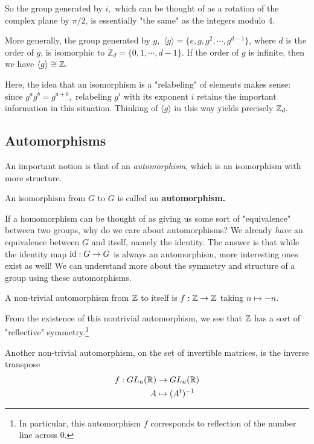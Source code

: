 So the group generated by $i,$ which can be thought of as a rotation of the complex plane by $\pi/2$, is essentially "the same" as the integers modulo 4. 

\begin{example}
More generally, the group generated by $g, $ $\langle g \rangle = \{e, g,  g^2, \cdots, g^{d-1}\}$, where $d$ is the order of $g$, is isomorphic to $\mathbb{Z}_d = \{0, 1, \cdots, d-1\}.$ If the order of $g$ is infinite, then we have $\langle g\rangle \cong \mathbb Z.$
\end{example}

Here, the idea that an isomorphism is a "relabeling" of elements makes sense: since $g^{a}g^{b} = g^{a + b},$ relabeling $g^i$ with its exponent $i$ retains the important information in this situation. Thinking of $\langle g \rangle$ in this way yields precisely $\mathbb Z_d.$ 

\subsection{Automorphisms}

An important notion is that of an \emph{automorphism}, which is an isomorphism with more structure. 
\begin{definition}
An isomorphism from $G$ to $G$ is called an \textbf{automorphism.}
\end{definition}

If a homomorphism can be thought of as giving us some sort of "equivalence" between two groups, why do we care about automorphisms? We already \emph{have} an equivalence between $G$ and itself, namely the identity. The answer is that while the identity map $\text{id}: G \rightarrow G$ is always an automorphism, more interesting ones exist as well! We can understand more about the symmetry and structure of a group using these automorphisms.

\begin{example}
A non-trivial automorphism from $\mathbb Z$ to itself is $f: \mathbb Z \rightarrow \mathbb Z$ taking $n \mapsto -n.$
\end{example}

From the existence of this nontrivial automorphism, we see that $\mathbb Z$ has a sort of "reflective" symmetry.\footnote{In particular, this automorphism $f$ corresponds to reflection of the number line across 0.}

\begin{example}
Another non-trivial automorphism, on the set of invertible matrices, is the inverse transpose 
\begin{align*}
    f: GL_n(\mathbb R) &\rightarrow GL_n(\mathbb R) \\
    A &\mapsto (A^t)^{-1}
\end{align*}
\end{example}

